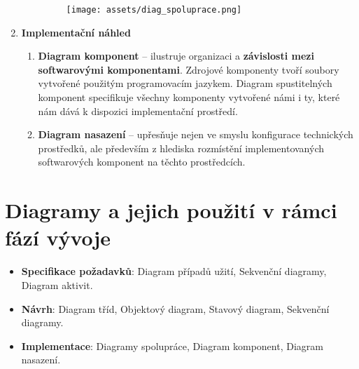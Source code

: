 \begin{enumerate}
\begin{enumerate}
                    \begin{figure}[H]
                        \centering
                        \texttt{[image: assets/diag\_spoluprace.png]}
                    \end{figure}
          \end{enumerate}
    \item \textbf{Implementační náhled}
          \begin{enumerate}
              \item \textbf{Diagram komponent} -- ilustruje organizaci a \textbf{závislosti mezi softwarovými komponentami}. Zdrojové komponenty tvoří soubory vytvořené použitým programovacím jazykem. Diagram spustitelných komponent specifikuje všechny komponenty vytvořené námi i ty, které nám dává k dispozici implementační prostředí.
              \item \textbf{Diagram nasazení} -- upřesňuje nejen ve smyslu konfigurace technických prostředků, ale především z hlediska rozmístění implementovaných softwarových komponent na těchto prostředcích.
          \end{enumerate}
\end{enumerate}


\section{Diagramy a jejich použití v rámci fází vývoje}
\begin{itemize}
    \item \textbf{Specifikace požadavků}: Diagram případů užití, Sekvenční diagramy, Diagram aktivit.
    \item \textbf{Návrh}: Diagram tříd, Objektový diagram, Stavový diagram, Sekvenční diagramy.
    \item \textbf{Implementace}: Diagramy spolupráce, Diagram komponent, Diagram nasazení.
\end{itemize}
